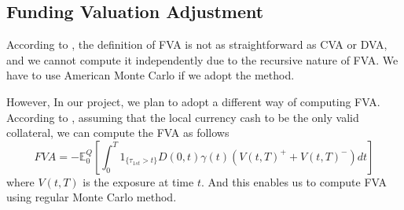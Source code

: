 \subsection{Funding Valuation Adjustment}

According to \cite{brigobook}, the definition of FVA is not as straightforward as CVA or DVA, and we cannot compute it independently due to the recursive nature of FVA. We have to use American Monte Carlo if we adopt the method. 

However, In our project, we plan to adopt a different way of computing FVA. According to \cite{hidde2014}, assuming that the local currency cash to be the only valid collateral, we can compute the FVA as follows
$$ FVA=-\mathbb{E}_0^Q[\int_0^T{1_{\{\tau_{1st}>t\}} D(0,t) \gamma(t)(V(t,T)^+ + V(t,T)^-)} dt]$$
where $V(t,T)$ is the exposure at time $t$. And this enables us to compute FVA using regular Monte Carlo method.

